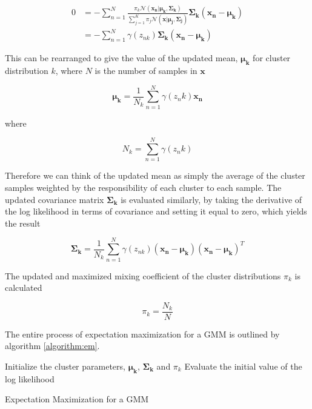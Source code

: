 \begin{align}
    0   &= -\sum^N_{n=1}\frac{\pi_k \mathcal{N}(\bm{x_n}|\bm{\mu_k},\bm{\Sigma_k})}{\sum\limits_{j=1}^{K}\pi_j\mathcal{N}(\bm{x}|\bm{\mu_j},        \bm{\Sigma_j})}\bm{\Sigma_k}(\bm{x_n} - \bm{\mu_k})\\
        &= -\sum^N_{n=1}\gamma(z_{nk})\bm{\Sigma_k}(\bm{x_n} - \bm{\mu_k})
    \label{eq:derivative_mean}
\end{align}

This can be rearranged to give the value of the updated mean, $\bm{\mu_k}$ for cluster distribution $k$, where $N$ is the number of samples in $\bm{x}$ 

\begin{equation}
    \label{eq:updated_mean}
    \bm{\mu_k} = \frac{1}{N_k}\sum_{n=1}^N \gamma(z_nk)\bm{x_n}
\end{equation}

where 

\begin{equation}
    \label{eq:nk}
    N_k = \sum_{n=1}^N \gamma(z_nk)
\end{equation}

Therefore we can think of the updated mean as simply the average of the cluster samples weighted by the responsibility of each cluster to each sample. The updated covariance matrix $\bm{\Sigma_k}$ is evaluated similarly, by taking the derivative of the log likelihood in terms of covariance and setting it equal to zero, which yields the result

\begin{equation}
    \label{eq:updated_covariance}
    \bm{\Sigma_k} = \frac{1}{N_k}\sum_{n=1}^{N}\gamma(z_{nk})(\bm{x_n}-\bm{\mu_k})(\bm{x_n}-\bm{\mu_k})^T 
\end{equation}

The updated and maximized mixing coefficient of the cluster distributions $\pi_k$ is calculated

\begin{equation}
    \label{eq:updated_mixing_coefficient}
    \pi_k = \frac{N_k}{N}
\end{equation}

The entire process of expectation maximization for a GMM is outlined by algorithm \ref{algorithm:em}.

\begin{algorithm}
    \SetAlgoLined
    Initialize the cluster parameters, $\bm{\mu_k}$, $\bm{\Sigma_k}$ and $\pi_k$\;
    Evaluate the initial value of the log likelihood\;
    \caption{Expectation Maximization for a GMM \cite{patterns_machine_learning}}
    \label{algorithm:em}
\end{algorithm}